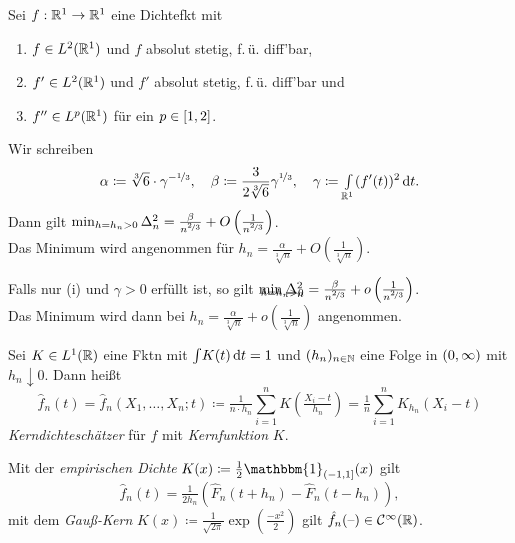 \documentclass{cheat-sheet}
\newcommand{\ind}{\mathbbm{1}} %
\newcommand{\Cont}{\mathcal{C}} %
\begin{document}
\begin{satz}
  Sei $f : \mathbb{R}^1 \to \mathbb{R}^1$ eine Dichtefkt mit
  \begin{enumerate}[label=(\roman*), itemindent=10pt]
    \item $f \in L^2(\mathbb{R}^1)$ und $f$ absolut stetig, \dh{} f.\,ü. diff'bar,
    \item $f' \in L^2(\mathbb{R}^1)$ und $f'$ absolut stetig, \dh{} f.\,ü. diff'bar und
    \item $f'' \in L^p(\mathbb{R}^1)$ für ein $p \in \left[ 1, 2 \right]$.
  \end{enumerate}
  Wir schreiben
  \[
    \alpha \coloneqq \sqrt[3]{6} \cdot \gamma^{- \nicefrac{1}{3}}, \quad
    \beta \coloneqq \frac{3}{2 \sqrt[3]{6}} \gamma^{\nicefrac{1}{3}}, \quad
    \gamma \coloneqq {\textstyle \int\limits_{\mathbb{R}^1}^{}} (f'(t))^2 \,\mathrm{d} t.
  \]
  Dann gilt \enspace
  $\min_{h = h_n > 0} \Delta_n^2 = \tfrac{\beta}{n^{\nicefrac{2}{3}}} + O \left( \tfrac{1}{n^{\nicefrac{2}{3}}} \right)$. \\
  Das Minimum wird angenommen für \enspace
  $h_n = \tfrac{\alpha}{\sqrt[3]{n}} + O \left( \tfrac{1}{\sqrt[3]{n}} \right)$.

  Falls nur (i) und $\gamma > 0$ erfüllt ist, so gilt
  $\min_{\mathclap{h = h_n > 0}} \Delta_n^2 = \tfrac{\beta}{n^{\nicefrac{2}{3}}} + o \left( \tfrac{1}{n^{\nicefrac{2}{3}}} \right)$. \\
  Das Minimum wird dann bei $h_n = \tfrac{\alpha}{\sqrt[3]{n}} + o \left( \tfrac{1}{\sqrt[3]{n}} \right)$ angenommen.
\end{satz}

\begin{defn}
  Sei $K \in L^1(\mathbb{R})$ eine Fktn mit ${\textstyle \int} K(t) \,\mathrm{d} t = 1$ und $(h_n)_{n \in \mathbb{N}}$ eine Folge in $\left( 0, \infty \right)$ mit $h_n \downarrow 0$.
  Dann heißt
  \[
    \hat{f}_n(t) =
    \hat{f}_n(X_1, \ldots, X_n; t) \coloneqq
    \tfrac{1}{n \cdot h_n} \sum_{i=1}^n K \left( \tfrac{X_i - t}{h_n} \right) =
    \tfrac{1}{n} \sum_{i=1}^n K_{h_n} (X_i - t)
  \]
  \emph{Kerndichteschätzer} für $f$ mit \textit{Kernfunktion} $K$.
\end{defn}


\begin{bspe}
  Mit der \emph{empirischen Dichte} $K(x) \coloneqq \tfrac{1}{2} \ind_{\ocinterval{-1}{1}}(x)$ gilt
  \[ \hat{f}_n(t) = \tfrac{1}{2 h_n} \left( \hat{F}_n(t + h_n) - \hat{F}_n(t - h_n) \right), \]
  mit dem \emph{Gauß-Kern} $K(x) \coloneqq \tfrac{1}{\sqrt{2 \pi}}\exp( \tfrac{- x^2}{2})$ gilt $\hat{f}_n(\blank) \in \Cont^\infty(\R)$.
\end{bspe}
\end{document}
